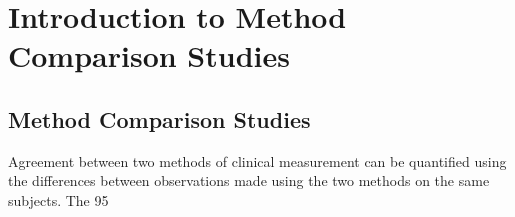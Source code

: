 \documentclass{report}
\begin{document}
\tableofcontents
\newpage
\chapter{Introduction to Method Comparison Studies}



\newpage
\section{Method Comparison Studies}

Agreement between two methods of clinical measurement can be quantified using the differences between observations made using the two methods on the same subjects. The 95%
\end{document}
